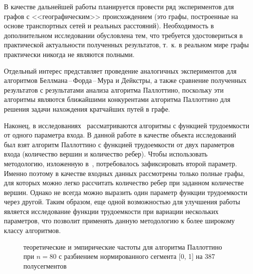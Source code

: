 \documentclass[a4paper,fontsize=14pt]{article}
\begin{document}
В качестве дальнейшей работы планируется провести ряд экспериментов для графов с <<географическим>> происхождением (это графы, построенные на основе транспортных сетей и реальных расстояний). Необходимость в дополнительном исследовании обусловлена тем, что требуется удостовериться в практической актуальности полученных результатов, т.~к. в реальном мире графы практически никогда не являются полными.

Отдельный интерес представляет проведение аналогичных экспериментов для алгоритмов Беллмана\,--\,Форда\,--\,Мура и Дейкстры, а также сравнение полученных результатов с результатами анализа алгоритма Паллоттино, поскольку эти алгоритмы являются ближайшими конкурентами алгоритма Паллоттино для решения задачи нахождения кратчайших путей в графе.

Наконец, в исследованиях~\cite{petrushyn_ulyanov_planning, petrushyn_ulyanov_analysis} рассматриваются алгоритмы с функцией трудоемкости от одного параметра входа. В данной работе в качестве объекта исследований был взят алгоритм Паллоттино с функцией трудоемкости от двух параметров входа (количество вершин и количество ребер). Чтобы использовать методологию, изложенную в~\cite{petrushyn_ulyanov_analysis}, потребовалось зафиксировать второй параметр. Именно поэтому в качестве входных данных рассмотрены только полные графы, для которых можно легко рассчитать количество ребер при заданном количестве вершин. Однако не всегда можно выразить один параметр функции трудоемкости через другой. Таким образом, еще одной возможностью для улучшения работы является исследование функции трудоемкости при вариации нескольких параметров, что позволит применять данную методологию к более широкому классу алгоритмов.

\begin{figure}[!]
	\caption{теоретические и эмпирические частоты для алгоритма Паллоттино при $n = 80$ с разбиением нормированного сегмента [0, 1] на 387 полусегментов}
	\label{fig:histogram}
\end{figure}
\end{document}
